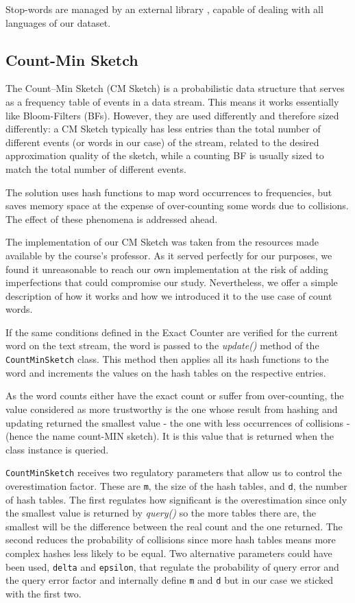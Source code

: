 \documentclass[shortpaper]{revdetua}
\begin{document}
Stop-words are managed by an external library \cite{stop-words}, capable of dealing with all languages of our dataset.

\subsection{Count-Min Sketch}

The Count–Min Sketch (CM Sketch) is a probabilistic data structure that serves as a frequency table of events in a data stream.
This means it works essentially like Bloom-Filters (BFs).
However, they are used differently and therefore sized differently: 
a CM Sketch typically has less entries than the total number of different events (or words in our case) of the stream, related to the desired approximation 
quality of the sketch, while a counting BF is usually sized to match the total number of different events. 

The solution uses hash functions to map word occurrences to frequencies, but saves memory space at the expense of over-counting some words due to collisions.
The effect of these phenomena is addressed ahead.
\newline

The implementation of our CM Sketch was taken from the resources made available by the course's professor.
As it served perfectly for our purposes, we found it unreasonable to reach our own implementation at the risk of adding imperfections that could compromise our study.
Nevertheless, we offer a simple description of how it works and how we introduced it to the use case of count words.

If the same conditions defined in the Exact Counter are verified for the current word on the text stream, the word is passed to the \textit{update()} method of 
the \texttt{CountMinSketch} class.
This method then applies all its hash functions to the word and increments the values on the hash tables on the respective entries.

As the word counts either have the exact count or suffer from over-counting, the value considered as more trustworthy is the one whose result from hashing and 
updating returned the smallest value - the one with less occurrences of collisions - (hence the name count-MIN sketch).
It is this value that is returned when the class instance is queried.

\texttt{CountMinSketch} receives two regulatory parameters that allow us to control the overestimation factor.
These are \texttt{m}, the size of the hash tables, and \texttt{d}, the number of hash tables.
The first regulates how significant is the overestimation since only the smallest value is returned by \textit{query()} so the more tables there are, the 
smallest will be the difference between the real count and the one returned.
The second reduces the probability of collisions since more hash tables means more complex hashes less likely to be equal.
Two alternative parameters could have been used, \texttt{delta} and \texttt{epsilon}, that regulate the probability of query error and the query error factor 
and internally define \texttt{m} and \texttt{d} but in our case we sticked with the first two.
\end{document}
